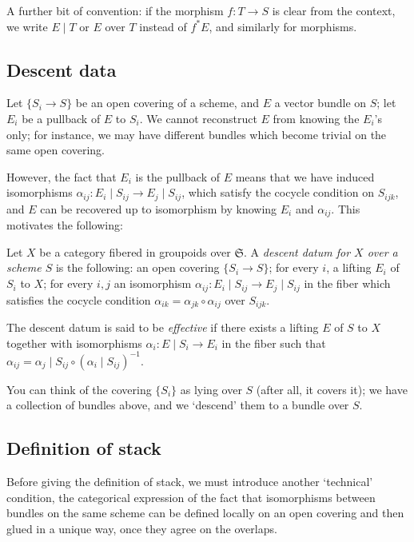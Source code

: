 \documentclass[12pt]{memoir}
\begin{document}
A further bit of convention: if the morphism $f\colon T \to S$ is clear from the context, we write $E \mid T$ or $E$ over $T$ instead of $f^* E$, and similarly for morphisms.

\subsection{Descent data}

Let $\{S_i \to S\}$ be an open covering of a scheme, and $E$ a vector bundle on $S$; let $E_i$ be a pullback of $E$ to $S_i$. We cannot reconstruct $E$ from knowing the $E_i$'s only; for instance, we may have different bundles which become trivial on the same open covering.

However, the fact that $E_i$ is the pullback of $E$ means that we have induced isomorphisms $\alpha_{ij}\colon E_i \mid S_{ij} \to E_j \mid S_{ij}$, which satisfy the cocycle condition on $S_{ijk}$, and $E$ can be recovered up to isomorphism by knowing $E_i$ and $\alpha_{ij}$. This motivates the following:

\begin{Def}\label{def:4.1}
Let $X$ be a category fibered in groupoids over $\mathfrak{S}$. A \emph{descent datum for $X$ over a scheme $S$} is the following: an open covering $\{S_i \to S\}$; for every $i$, a lifting $E_i$ of $S_i$ to $X$; for every $i, j$ an isomorphism $\alpha_{ij}\colon E_i \mid S_{ij} \to E_j \mid S_{ij}$ in the fiber which satisfies the cocycle condition $\alpha_{ik} = \alpha_{jk} \circ \alpha_{ij}$ over $S_{ijk}$.

The descent datum is said to be \emph{effective} if there exists a lifting $E$ of $S$ to $X$ together with isomorphisms $\alpha_i\colon E \mid S_i \to E_i$ in the fiber such that $\alpha_{ij} = \alpha_j \mid S_{ij} \circ (\alpha_i \mid S_{ij})^{-1}$.
\end{Def}

You can think of the covering $\{S_i\}$ as lying over $S$ (after all, it covers it); we have a collection of bundles above, and we `descend' them to a bundle over $S$.

\subsection{Definition of stack}

Before giving the definition of stack, we must introduce another `technical' condition, the categorical expression of the fact that isomorphisms between bundles on the same scheme can be defined locally on an open covering and then glued in a unique way, once they agree on the overlaps.
\end{document}
